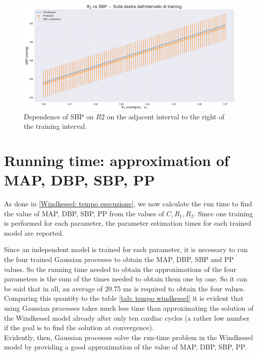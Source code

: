 \begin{figure}
    \centering
    \includegraphics[width=1\textwidth]{images/Training (risultati)/SBP/SBP - R2 - dx.pdf}
    \caption{Dependence of SBP on $R2$ on the adjacent interval to the right of the training interval.}
    \label{SBP - R2 - dx}
\end{figure}

\section{Running time: approximation of MAP, DBP, SBP, PP}
As done in \ref{Windkessel: tempo esecuzione}, we now calculate the run time to find the value of MAP, DBP, SBP, PP from the values of $C, R_1, R_2$. Since one training is performed for each parameter, the parameter estimation times for each trained model are reported.



Since an independent model is trained for each parameter, it is necessary to run the four trained Gaussian processes to obtain the MAP, DBP, SBP and PP values. So the running time needed to obtain the approximations of the four parameters is the sum of the times needed to obtain them one by one. So it can be said that in all, an average of 20.75 ms is required to obtain the four values.
Comparing this quantity to the table \ref{tab: tempo windkessel} it is evident that using Gaussian processes takes much less time than approximating the solution of the Windkessel model already after only ten cardiac cycles (a rather low number if the goal is to find the solution at convergence). \\


Evidently, then, Gaussian processes solve the run-time problem in the Windkessel model by providing a good approximation of the value of MAP, DBP, SBP, PP.
